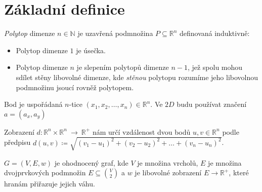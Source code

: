 \chapter*{Základní definice}
\label{sec:zakladni-pojmy}

\begin{definition}[Polytop]
    \emph{Polytop} dimenze $n \in \mathbb{N}$ je uzavřená podmnožina $P \subseteq \mathbb{R}^{n}$ definovaná induktivně:
    \begin{itemize}
        \item Polytop dimenze $1$ je úsečka.
        \item Polytop dimenze $n$ je slepením polytopů dimenze $n-1$, jež spolu mohou
            sdílet stěny libovolné dimenze, kde \emph{stěnou} polytopu rozumíme jeho
            libovolnou podmnožinu jsoucí rovněž polytopem. \autocite{adamklepacDefinicePolytopu2024}
    \end{itemize}
    
\end{definition}

\begin{definition}[Bod]
    \label{definice:bod}
    Bod je uspořádaná $n$-tice $(x_1, x_2, \ldots, x_n) \in \mathbb{R}^n$. Ve $2D$ budu používat značení $a=(a_x, a_y)$
\end{definition}

\begin{definition}[Vzdálenost]
    \label{definice:vzdalenost}
    Zobrazení $d: \mathbb{R}^n\times \mathbb{R}^n~\rightarrow~\mathbb{R}^+$ nám určí vzdálenost dvou bodů $u, v \in \mathbb{R}^n$
    podle předpisu $d(u, v) \coloneqq \sqrt{(v_1-u_1)^2+(v_2-u_2)^2+\ldots+(v_n-u_n)^2}$.
\end{definition}

\begin{definition}
    \label{definice:ohodnoceny_graf}
    $G = (V, E, w)$ je ohodnocený graf, kde $V$ je množina vrcholů, $E$ je množina dvojprvkových podmnožin $E \subseteq \binom{V}{2}$ a $w$ je libovolné zobrazení $E \rightarrow \mathds{R}^+$, které hranám přiřazuje jejich váhu.
\end{definition}

